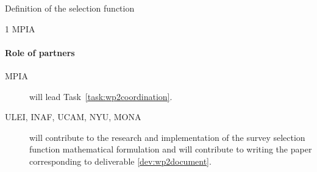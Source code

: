 \begin{workpackage}{Definition of the selection function}
\begin{wpdescription}
{      \textsf{1 MPIA \pem}
    }

    \paragraph{Role of partners}
    \begin{description}
      \item[MPIA] will lead Task~\ref{task:wp2coordination}.
      \item[ULEI, INAF, UCAM, NYU, MONA] will contribute to the research and implementation of the survey selection function mathematical formulation and will contribute to writing the paper corresponding to deliverable \ref{dev:wp2document}.
    \end{description}
  \end{wpdescription}

  \begin{wpdeliverables}
    \label{dev:wp2document}
  \end{wpdeliverables}

\end{workpackage}


